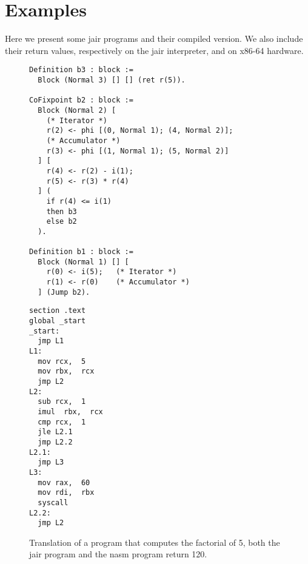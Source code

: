\section{Examples}
\label{sec:examples}

Here we present some \gls{jair} programs and their compiled version. We also include their return values, respectively on the \gls{jair} interpreter, and on x86-64 hardware.

\begin{figure}[ht]
\begin{minipage}{0.68\linewidth}
\centering
\begin{lstlisting}[style=Rocq]
Definition b3 : block :=
  Block (Normal 3) [] [] (ret r(5)).

CoFixpoint b2 : block :=
  Block (Normal 2) [
    (* Iterator *)
    r(2) <- phi [(0, Normal 1); (4, Normal 2)];
    (* Accumulator *)
    r(3) <- phi [(1, Normal 1); (5, Normal 2)]
  ] [
    r(4) <- r(2) - i(1);
    r(5) <- r(3) * r(4)
  ] (
    if r(4) <= i(1)
    then b3
    else b2
  ).

Definition b1 : block :=
  Block (Normal 1) [] [
    r(0) <- i(5);   (* Iterator *)
    r(1) <- r(0)    (* Accumulator *)
  ] (Jump b2).
\end{lstlisting}
\end{minipage}
\hfill
\begin{minipage}{0.28\linewidth}
\centering
\begin{lstlisting}[style=NASM]
section .text
global _start
_start:
  jmp L1
L1:
  mov rcx,  5
  mov rbx,  rcx
  jmp L2
L2:
  sub rcx,  1
  imul  rbx,  rcx
  cmp rcx,  1
  jle L2.1
  jmp L2.2
L2.1:
  jmp L3
L3:
  mov rax,  60
  mov rdi,  rbx
  syscall
L2.2:
  jmp L2
\end{lstlisting}
\end{minipage}
\caption{Translation of a program that computes the factorial of 5, both the \gls{jair} program and the \gls{nasm} program return 120.}
\label{fig:ex1}
\end{figure}

